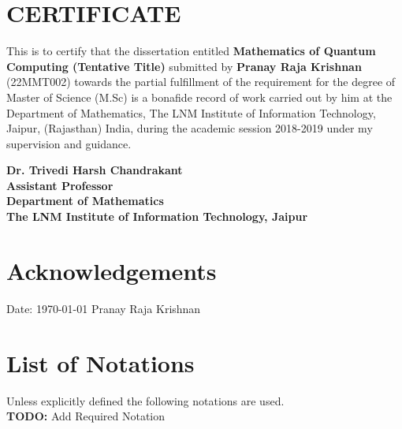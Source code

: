 \documentclass[12pt,twoside]{report}
\begin{document}
\renewcommand{\sectionmark}[1]{\markright{#1}}

\chapter*{\centering CERTIFICATE}

This is to certify that the dissertation entitled \textbf{Mathematics of Quantum Computing (Tentative Title)} submitted by \textbf{Pranay Raja Krishnan} (22MMT002) towards the partial fulfillment of the requirement for the degree of Master of Science (M.Sc) is a bonafide record of work carried out by him at the Department of Mathematics, The LNM Institute of Information Technology, Jaipur, (Rajasthan) India, during the academic session 2018-2019 under my supervision and guidance. \\
\vspace*{3cm}
\begin{flushright}
	\hfill
	{\parbox{7cm}{\textbf{Dr. Trivedi Harsh Chandrakant\\
	Assistant Professor\\
	Department of Mathematics\\
	The LNM Institute of Information Technology, Jaipur}}}
\end{flushright}

\chapter*{\centering Acknowledgements}

\lipsum[2]


\vspace*{3cm}
Date: \today
\hfill{}
Pranay Raja Krishnan

\chapter*{List of Notations}
Unless explicitly defined the following notations are used.\\
\textbf{TODO:} Add Required Notation \\
\end{document}
